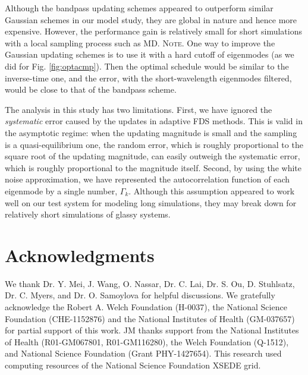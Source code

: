 \documentclass[reprint, superscriptaddress, floatfix]{revtex4-1}
\newcommand{\note}[1]{{\color{DarkGreen}\footnotesize \textsc{Note.} #1}}
\begin{document}
Although the bandpass updating schemes
appeared to outperform similar Gaussian schemes
in our model study,
they are global in nature
and hence more expensive.
%
However, the performance gain
is relatively small for short simulations
with a local sampling process such as MD.
%
\note{
One way to improve the Gaussian updating schemes
is to use it with a hard cutoff of eigenmodes
(as we did for Fig. \ref{fig:optacmp}).
%
Then the optimal schedule
would be similar to the inverse-time one,
and the error, with the short-wavelength eigenmodes filtered,
would be close to that of the bandpass scheme.
}



The analysis in this study has two limitations.
%
First, we have ignored the \emph{systematic}
error\cite{zhou2005, morozov2007, zhou2008}
caused by the updates in adaptive FDS methods.
%
This is valid in the asymptotic regime:
when the updating magnitude is small
and the sampling is a quasi-equilibrium one\cite{
  zhou2005, morozov2007, zhou2008, barducci2008, dama2014},
the random error,
which is roughly proportional to
the square root of the updating magnitude\cite{
  zhou2005, morozov2007, zhou2008, bussi2006},
can easily outweigh
the systematic error,
which is roughly proportional to
the magnitude itself\cite{morozov2007}.
%
%
Second, by using the white noise approximation,
we have represented the autocorrelation function
of each eigenmode by a single number, $\Gamma_k$.
%
Although this assumption appeared to work well
on our test system for modeling long simulations,
they may break down for relatively short simulations
of glassy systems.


\section{Acknowledgments}

We thank Dr. Y. Mei, J. Wang,
O. Nassar, Dr. C. Lai, Dr. S. Ou, D. Stuhlsatz,
Dr. C. Myers, and Dr. O. Samoylova
for helpful discussions.
%
We gratefully acknowledge the Robert A. Welch Foundation (H-0037),
the National Science Foundation (CHE-1152876)
and the National Institutes of Health (GM-037657)
for partial support of this work.
%
JM thanks support from the National Institutes of Health (R01-GM067801, R01-GM116280),
the Welch Foundation (Q-1512),
and National Science Foundation (Grant PHY-1427654).
%
This research used computing resources of the National Science Foundation XSEDE grid.
%
%
\end{document}
